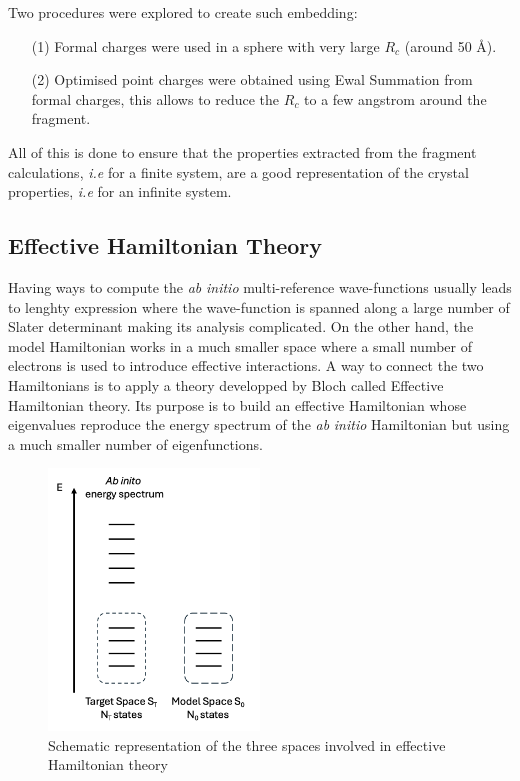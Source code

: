 \documentclass[10pt]{report}
\numberwithin{equation}{section}
\begin{document}
Two procedures were explored to create such embedding:
\begin{itemize}
    \item[(1)] Formal charges were used in a sphere with very large $R_c$ (around 50 \AA{}).
    \item[(2)] Optimised point charges were obtained using Ewal Summation from formal charges, this allows to reduce the $R_c$ to a few angstrom around the fragment.
\end{itemize}

All of this is done to ensure that the properties extracted from the fragment calculations, \textit{i.e} for a finite system, are a good representation of the crystal properties, \textit{i.e} for an infinite system.

\subsection{Effective Hamiltonian Theory}

Having ways to compute the \textit{ab} \textit{initio} multi-reference wave-functions usually leads to lenghty expression where the wave-function is spanned along a large number of Slater determinant making its analysis complicated.
On the other hand, the model Hamiltonian works in a much smaller space where a small number of electrons is used to introduce effective interactions.
A way to connect the two Hamiltonians is to apply a theory developped by Bloch called Effective Hamiltonian theory. 
Its purpose is to build an effective Hamiltonian whose eigenvalues reproduce the energy spectrum of the \textit{ab} \textit{initio} Hamiltonian but using a much smaller number of eigenfunctions.

\begin{figure}[!ht]
    \centering
    \includegraphics[width=0.5\textwidth]{Images/HEFF.png}
    \caption{Schematic representation of the three spaces involved in effective Hamiltonian theory}
    \label{fig:Heff}
\end{figure}
\end{document}
